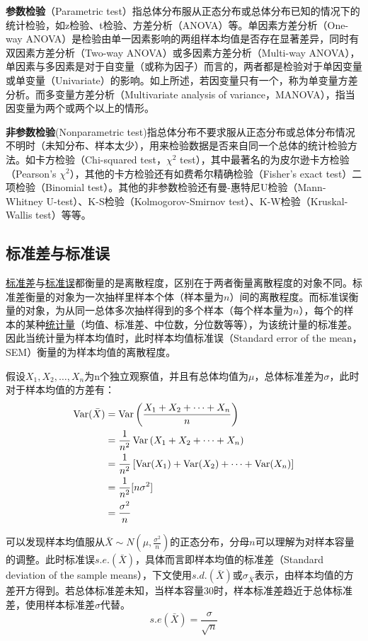 \documentclass[11pt]{article}
\begin{document}
\textbf{参数检验}（Parametric test）指总体分布服从正态分布或总体分布已知的情况下的统计检验，如z检验、t检验、方差分析（ANOVA）等。单因素方差分析（One-way ANOVA）是检验由单一因素影响的两组样本均值是否存在显著差异，同时有双因素方差分析（Two-way ANOVA）或多因素方差分析（Multi-way ANOVA），单因素与多因素是对于自变量（或称为因子）而言的，两者都是检验对于单因变量或单变量（Univariate）的影响。如上所述，若因变量只有一个，称为单变量方差分析。而多变量方差分析（Multivariate analysis of variance，MANOVA），指当因变量为两个或两个以上的情形。

\textbf{非参数检验}(Nonparametric test)指总体分布不要求服从正态分布或总体分布情况不明时（未知分布、样本太少），用来检验数据是否来自同一个总体的统计检验方法。如卡方检验（Chi-squared test，$\chi^2$ test），其中最著名的为皮尔逊卡方检验（Pearson's $\chi^2$），其他的卡方检验还有如费希尔精确检验（Fisher's exact test）二项检验（Binomial test）。其他的非参数检验还有曼-惠特尼U检验（Mann-Whitney U-test）、K-S检验（Kolmogorov-Smirnov test）、K-W检验（Kruskal-Wallis test）等等。

\subsection{标准差与标准误}
    
\uline{标准差}与\uline{标准误}都衡量的是离散程度，区别在于两者衡量离散程度的对象不同。标准差衡量的对象为一次抽样里样本个体（样本量为$n$）间的离散程度。而标准误衡量的对象，为从同一总体多次抽样得到的多个样本（每个样本量为$n$），每个的样本的某种\uline{统计量}（均值、标准差、中位数，分位数等等），为该统计量的标准差。因此当统计量为样本均值时，此时样本均值标准误（Standard error of the mean，SEM）衡量的为样本均值的离散程度。

假设$X_1,X_2,\dots,X_n$为n个独立观察值，并且有总体均值为$\mu$，总体标准差为$\sigma$，此时对于样本均值的方差有：
\begin{align*}
    \operatorname{Var}(\bar{X}) &= \operatorname{Var}\left(\frac{X_1 + X_2 + \dots + X_n}{n}\right) \\
    &= \frac{1}{n^2} \operatorname{Var}\left(X_1 + X_2 + \dots + X_n\right) \\
    &= \frac{1}{n^2} \left[ \operatorname{Var}(X_1) + \operatorname{Var}(X_2) + \dots + \operatorname{Var}(X_n) \right] \\
    &= \frac{1}{n^2} [n\sigma^2] \\
    &= \frac{\sigma^2}{n}
\end{align*}

可以发现样本均值服从$\bar{X}\sim N(\mu,\frac{\sigma^2}{n})$的正态分布，分母$n$可以理解为对样本容量的调整。此时标准误$s.e.(\bar{X})$，具体而言即样本均值的标准差（Standard deviation of the sample means），下文使用$s.d.(\bar{X})$或$\sigma_{\bar{X}}$表示，由样本均值的方差开方得到。若总体标准差未知，当样本容量30时，样本标准差趋近于总体标准差，使用样本标准差$\hat{\sigma}$代替。
\begin{equation*}
    s.e(\bar{X}) = \frac{\sigma}{\sqrt{n}}
\end{equation*}
\end{document}
